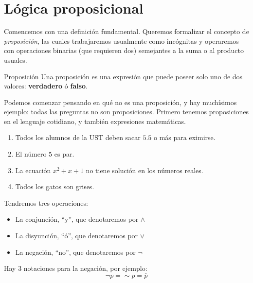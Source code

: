 \documentclass[12pt, twoside]{book}
\begin{document}
\section{Lógica proposicional}
Comencemos con una definición fundamental. Queremos formalizar el concepto de \emph{proposición}, las cuales trabajaremos usualmente como incógnitas y operaremos con operaciones binarias (que requieren dos) semejantes a la suma o al producto usuales.
\begin{definition}{Proposición}
    Una proposición es una expresión que puede poseer solo uno de dos valores: \textbf{verdadero} ó \textbf{falso}.
\end{definition}
Podemos comenzar pensando en qué no es una proposición, y hay muchísimos ejemplo: todas las preguntas no son proposiciones. Primero tenemos proposiciones en el lenguaje cotidiano, y también expresiones matemáticas.
\begin{example}
    \begin{enumerate}
        \item Todos los alumnos de la UST deben sacar \(5.5\) o más para eximirse.
        \item El número \(5\) es par.
        \item La ecuación \(x^2+x+1\) no tiene solución en los números reales.
        \item Todos los gatos son grises.
    \end{enumerate}
\end{example}


Tendremos tres operaciones:
\begin{itemize}[label=\(\bullet\)]
    \item La conjunción, \enquote{y}, que denotaremos por  \(\wedge\)
    \item La disyunción, \enquote{ó}, que denotaremos por \(\vee\)
    \item La negación, \enquote{no}, que denotaremos por \(\neg\)
\end{itemize}
\begin{note}
Hay 3 notaciones para la negación, por ejemplo:
    \[\neg p=\sim p =\overline{p}\]
\end{note}
\end{document}
